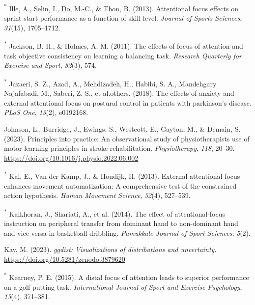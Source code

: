 \documentclass[
  man, donotrepeattitle,floatsintext]{apa7}
\newlength{\cslhangindent}
\newlength{\cslentryspacingunit} %
\newenvironment{CSLReferences}[2] %
 {%
  \setlength{\parindent}{0pt}
  \ifodd #1
  \let\oldpar\par
  \def\par{\hangindent=\cslhangindent\oldpar}
  \fi
  \setlength{\parskip}{#2\cslentryspacingunit}
 }%
 {}
\begin{document}
\begin{CSLReferences}{1}{0}
\leavevmode{}%
\textsuperscript{*} Ille, A., Selin, I., Do, M.-C., \& Thon, B. (2013). Attentional focus effects on sprint start performance as a function of skill level. \emph{Journal of Sports Sciences}, \emph{31}(15), 1705--1712.

\leavevmode{}%
\textsuperscript{*} Jackson, B. H., \& Holmes, A. M. (2011). The effects of focus of attention and task objective consistency on learning a balancing task. \emph{Research Quarterly for Exercise and Sport}, \emph{82}(3), 574.

\leavevmode{}%
\textsuperscript{*} Jazaeri, S. Z., Azad, A., Mehdizadeh, H., Habibi, S. A., Mandehgary Najafabadi, M., Saberi, Z. S., et al.others. (2018). The effects of anxiety and external attentional focus on postural control in patients with parkinson's disease. \emph{PLoS One}, \emph{13}(2), e0192168.

\leavevmode{}%
Johnson, L., Burridge, J., Ewings, S., Westcott, E., Gayton, M., \& Demain, S. (2023). Principles into practice: {An} observational study of physiotherapists use of motor learning principles in stroke rehabilitation. \emph{Physiotherapy}, \emph{118}, 20--30. \url{https://doi.org/10.1016/j.physio.2022.06.002}

\leavevmode{}%
\textsuperscript{*} Kal, E., Van der Kamp, J., \& Houdijk, H. (2013). External attentional focus enhances movement automatization: A comprehensive test of the constrained action hypothesis. \emph{Human Movement Science}, \emph{32}(4), 527--539.

\leavevmode{}%
\textsuperscript{*} Kalkhoran, J., Shariati, A., et al. (2014). The effect of attentional-focus instruction on peripheral transfer from dominant hand to non-dominant hand and vice versa in basketball dribbling. \emph{Pamukkale Journal of Sport Sciences}, \emph{5}(2).

\leavevmode{}%
Kay, M. (2023). \emph{{ggdist}: Visualizations of distributions and uncertainty}. \url{https://doi.org/10.5281/zenodo.3879620}

\leavevmode{}%
\textsuperscript{*} Kearney, P. E. (2015). A distal focus of attention leads to superior performance on a golf putting task. \emph{International Journal of Sport and Exercise Psychology}, \emph{13}(4), 371--381.


\end{CSLReferences}
\end{document}
